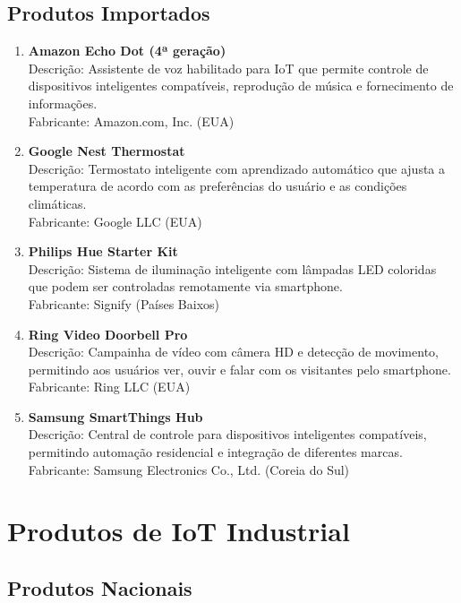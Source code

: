 \documentclass{estacio}
\begin{document}
\subsection{Produtos Importados}

\begin{enumerate}
    \item \textbf{Amazon Echo Dot (4ª geração)}\\
    Descrição: Assistente de voz habilitado para IoT que permite controle de dispositivos inteligentes compatíveis, reprodução de música e fornecimento de informações.\\
    Fabricante: Amazon.com, Inc. (EUA)

    \item \textbf{Google Nest Thermostat}\\
    Descrição: Termostato inteligente com aprendizado automático que ajusta a temperatura de acordo com as preferências do usuário e as condições climáticas.\\
    Fabricante: Google LLC (EUA)

    \item \textbf{Philips Hue Starter Kit}\\
    Descrição: Sistema de iluminação inteligente com lâmpadas LED coloridas que podem ser controladas remotamente via smartphone.\\
    Fabricante: Signify (Países Baixos)

    \item \textbf{Ring Video Doorbell Pro}\\
    Descrição: Campainha de vídeo com câmera HD e detecção de movimento, permitindo aos usuários ver, ouvir e falar com os visitantes pelo smartphone.\\
    Fabricante: Ring LLC (EUA)

    \item \textbf{Samsung SmartThings Hub}\\
    Descrição: Central de controle para dispositivos inteligentes compatíveis, permitindo automação residencial e integração de diferentes marcas.\\
    Fabricante: Samsung Electronics Co., Ltd. (Coreia do Sul)
\end{enumerate}

\section{Produtos de IoT Industrial}

\subsection{Produtos Nacionais}
\end{document}
